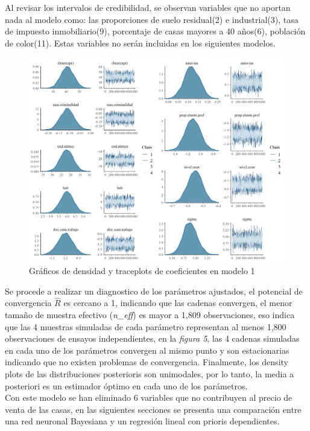 \documentclass[nojss]{jss}
\begin{document}
Al revisar los intervalos de credibilidad, se observan variables que no aportan nada al modelo como: las proporciones de suelo residual(2) e industrial(3), tasa de impuesto inmobiliario(9), porcentaje de casas mayores a 40 años(6), población de color(11). Estas variables no serán incluidas en los siguientes modelos.

\begin{figure}[H]
	\centering
	\includegraphics[scale=0.8]{images/traceplot1}
	\caption[trace1]{Gráficos de densidad y traceplots de coeficientes en modelo 1}
	\label{fig:fig5}
\end{figure}

Se procede a realizar un diagnostico de los parámetros ajustados, el potencial de convergencia $\widehat{R}$ es cercano a 1, indicando que las cadenas convergen,  el menor tamaño de muestra efectivo (\textit{n\_eff}) es mayor a 1,809 observaciones, eso indica que las 4 muestras simuladas de cada parámetro representan al menos 1,800 observaciones de ensayos independientes, en la \textit{figura 5}, las 4 cadenas simuladas en cada uno de los parámetros convergen al mismo punto y son estacionarias indicando que no existen problemas de convergencia. Finalmente, los density plots de las distribuciones posterioris son unimodales, por lo tanto, la media a posteriori es un estimador óptimo en cada uno de los parámetros.\\

Con este modelo se han eliminado 6 variables que no contribuyen al precio de venta de las casas, en las siguientes secciones se presenta una comparación entre una red neuronal Bayesiana y un regresión lineal con prioris dependientes.\\
\end{document}
